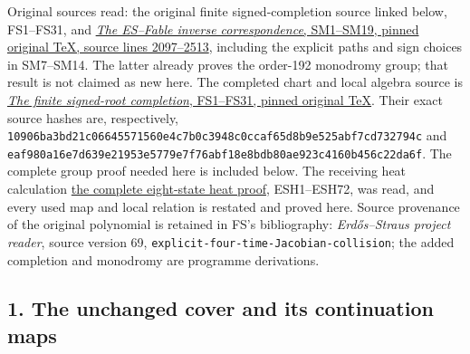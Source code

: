 \documentclass[
  10pt,
  a4paper,
]{article}
\begin{document}
Original sources read: the original finite signed-completion source
linked below, FS1--FS31, and
\href{https://github.com/KokunoYumeto/zeta-function-research-reader/blob/ab45e221579a0d48ce2885b4ecdf1a6aefc24a20/workbenches/splitzero-tandem/continuations/20260920-fable-boundary-action/FABLE_TO_ORIGINAL_CONDUCTOR.tex\#L2097}{\emph{The
ES--Fable inverse correspondence}, SM1--SM19, pinned original TeX,
source lines 2097--2513}, including the explicit paths and sign choices
in SM7--SM14. The latter already proves the order-192 monodromy group;
that result is not claimed as new here. The completed chart and local
algebra source is
\href{https://github.com/KokunoYumeto/zeta-function-research-reader/blob/0fd693c844aad9117e30ec447c59864a28af10f3/workbenches/splitzero-tandem/continuations/20260921-native-spectral-real-pair/005/independent/FINITE_SIGNED_COMPLETION.tex}{\emph{The
finite signed-root completion}, FS1--FS31, pinned original TeX}. Their
exact source hashes are, respectively,
\texttt{10906ba3\allowbreak{}bd21c066\allowbreak{}45571560\allowbreak{}e4c7b0c3\allowbreak{}948c0cca\allowbreak{}f65d8b9e\allowbreak{}525abf7c\allowbreak{}d732794c}
and
\texttt{eaf980a1\allowbreak{}6e7d639e\allowbreak{}21953e57\allowbreak{}79e7f76a\allowbreak{}bf18e8bd\allowbreak{}b80ae923\allowbreak{}c4160b45\allowbreak{}6c22da6f}.
The complete group proof needed here is included below. The receiving
heat calculation
\href{https://github.com/KokunoYumeto/zeta-function-research-reader/blob/d5c9d198a8432e3ede468b280162a99c00e3f4f7/workbenches/splitzero-tandem/branches/tau-zero-prime-positivity/EIGHT_STATE_HEAT_COMPARISON.md}{the
complete eight-state heat proof}, ESH1--ESH72, was read, and every used
map and local relation is restated and proved here. Source provenance of
the original polynomial is retained in FS's bibliography:
\emph{Erdős--Straus project reader}, source version 69,
\texttt{explicit-\allowbreak{}four-\allowbreak{}time-\allowbreak{}Jacobian-\allowbreak{}collision}; the added completion and
monodromy are programme derivations.

\subsection{1. The unchanged cover and its continuation
maps}\label{the-unchanged-cover-and-its-continuation-maps}
\end{document}
